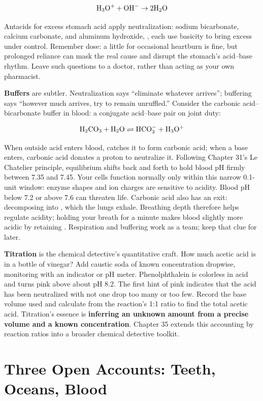 \[\mathrm{H_3O^+} + \mathrm{OH^-} \rightarrow \mathrm{2H_2O}\]

Antacids for excess stomach acid apply neutralization: sodium bicarbonate, calcium carbonate, and aluminum hydroxide, , each use basicity to bring excess  under control. Remember dose: a little for occasional heartburn is fine, but prolonged reliance can mask the real cause and disrupt the stomach's acid--base rhythm. Leave such questions to a doctor, rather than acting as your own pharmacist.

\textbf{Buffers} are subtler. Neutralization says ``eliminate whatever arrives''; buffering says ``however much arrives, try to remain unruffled.'' Consider the carbonic acid--bicarbonate buffer in blood: a conjugate acid--base pair on joint duty:

\[\mathrm{H_2CO_3} + \mathrm{H_2O} \rightleftharpoons \mathrm{HCO_3^-} + \mathrm{H_3O^+}\]

When outside acid enters blood,  catches it to form carbonic acid; when a base enters, carbonic acid donates a proton to neutralize it. Following Chapter 31's Le Chatelier principle, equilibrium shifts back and forth to hold blood pH firmly between 7.35 and 7.45. Your cells function normally only within this narrow 0.1-unit window: enzyme shapes and ion charges are sensitive to acidity. Blood pH below 7.2 or above 7.6 can threaten life. Carbonic acid also has an exit: decomposing into , which the lungs exhale. Breathing depth therefore helps regulate acidity; holding your breath for a minute makes blood slightly more acidic by retaining . Respiration and buffering work as a team; keep that clue for later.

\textbf{Titration} is the chemical detective's quantitative craft. How much acetic acid is in a bottle of vinegar? Add caustic soda of known concentration dropwise, monitoring with an indicator or pH meter. Phenolphthalein is colorless in acid and turns pink above about pH 8.2. The first hint of pink indicates that the acid has been neutralized with not one drop too many or too few. Record the base volume used and calculate from the reaction's 1:1 ratio to find the total acetic acid. Titration's essence is \textbf{inferring an unknown amount from a precise volume and a known concentration}. Chapter 35 extends this accounting by reaction ratios into a broader chemical detective toolkit.

\section{Three Open Accounts: Teeth, Oceans, Blood}

